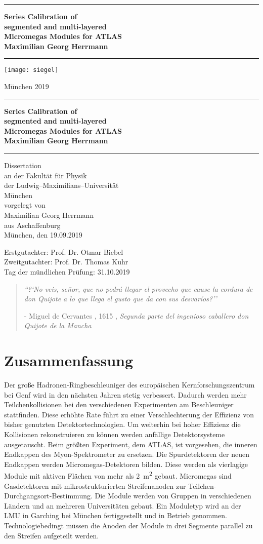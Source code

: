 \documentclass[
twoside,            %
BCOR1.4cm,          %
10pt,               %
headings=normal,    %
headsepline,        %
clearplainpage,		%
final,              %
div=14,
open=right,
bibliography=toc
]{scrreprt}
\newcommand{\LMUTitle}[9]{
  \thispagestyle{empty}
  \vspace*{\stretch{1}}
  {\parindent0cm
   \rule{\linewidth}{.7ex}}
  \begin{flushright}

    \vspace*{\stretch{1}}
    \sffamily\bfseries\Huge
    #1\\
    \vspace*{\stretch{1}}
    \sffamily\bfseries\large
    #2
    \vspace*{\stretch{1}}
  \end{flushright}
  \rule{\linewidth}{.7ex}
  \vspace*{\stretch{5}}
  \begin{center}
    \texttt{[image: siegel]}
  \end{center}
  \vspace*{\stretch{1}}
  \begin{center}\sffamily\LARGE{#5}\end{center}
  \newpage
  \thispagestyle{empty}

  \cleardoublepage
  \thispagestyle{empty}

  \vspace*{\stretch{1}}
  {\parindent0cm
  \rule{\linewidth}{.7ex}}
  \begin{flushright}
    \vspace*{\stretch{1}}
    \sffamily\bfseries\Huge
    #1\\
    \vspace*{\stretch{1}}
    \sffamily\bfseries\large
    #2
    \vspace*{\stretch{1}}
  \end{flushright}
  \rule{\linewidth}{.7ex}

  \vspace*{\stretch{3}}
  \begin{center}
    \Large Dissertation\\
    \Large an der #4\\
    \Large der Ludwig--Maximilians--Universit\"at\\
    \Large M\"unchen\\
    \vspace*{\stretch{1}}
    \Large vorgelegt von\\
    \Large #2\\
    \Large aus #3\\
    \vspace*{\stretch{2}}
    \Large M\"unchen, den #6
  \end{center}

  \newpage
  \thispagestyle{empty}

  \vspace*{\stretch{1}}

  \begin{flushleft}
    \large Erstgutachter:  #7 \\[1mm]
    \large Zweitgutachter: #8 \\[1mm]
    \large Tag der m\"undlichen Pr\"ufung: #9\\
  \end{flushleft}

  \cleardoublepage
}
\begin{document}



  \LMUTitle
      {Series Calibration of \\
       segmented and multi-layered \\
       Micromegas Modules for ATLAS}           %
      {Maximilian Georg Herrmann}              %
      {Aschaffenburg}                          %
      {Fakult\"at f\"ur Physik}                %
      {M\"unchen 2019}                         %
      {19.09.2019}                             %
      {Prof. Dr. Otmar Biebel}                 %
      {Prof. Dr. Thomas Kuhr}                  %
      {31.10.2019}                             %
      
\newpage

\vspace*{\fill} 
\begin{quote} 
	\textit{``?`No veis, se\~{n}or, que no podr\'{a} llegar el provecho que cause la cordura de don Quijote a lo que llega el gusto que da con  sus desvar\'{i}os?''}
	
	\hfill - Miguel de Cervantes , 1615 , \textit{Segunda parte del ingenioso caballero don Quijote de la Mancha}
\end{quote}
\vspace*{\fill}
      
\chapter*{Zusammenfassung}

Der gro\ss e Hadronen-Ringbeschleuniger des europ\"aischen Kernforschungszentrum bei Genf wird in den n\"achsten Jahren stetig verbessert.
Dadurch werden mehr Teilchenkollisionen bei den verschiedenen Experimenten am Beschleuniger stattfinden.
Diese erh\"ohte Rate f\"uhrt zu einer Verschlechterung der Effizienz von bisher genutzten Detektortechnologien.
Um weiterhin bei hoher Effizienz die Kollisionen rekonstruieren zu k\"onnen werden anf\"allige Detektorsysteme ausgetauscht.
Beim gr\"o\ss ten Experiment, dem ATLAS, ist vorgesehen, die inneren Endkappen des Myon-Spektrometer zu ersetzen.
Die Spurdetektoren der neuen Endkappen werden Micromegas-Detektoren bilden.
Diese werden als vierlagige Module mit aktiven Fl\"achen von mehr als \SI{2}{\square\m} gebaut.
Micromegas sind Gasdetektoren mit mikrostrukturierten Streifenanoden zur Teilchen-Durchgangsort-Bestimmung.
Die Module werden von Gruppen in verschiedenen L\"andern und an mehreren Universit\"aten gebaut.
Ein Moduletyp wird an der LMU in Garching bei M\"unchen fertiggestellt und in Betrieb genommen.
Technologiebedingt m\"ussen die Anoden der Module in drei Segmente parallel zu den Streifen aufgeteilt werden.
\end{document}
